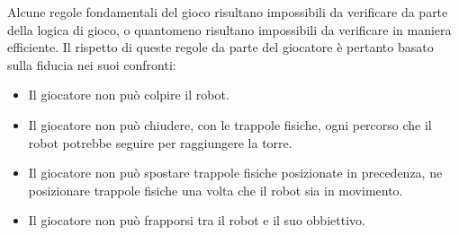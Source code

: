 Alcune regole fondamentali del gioco risultano impossibili da verificare da parte della logica di gioco, o quantomeno risultano impossibili da verificare in maniera efficiente. Il rispetto di queste regole da parte del giocatore è pertanto basato sulla fiducia nei suoi confronti:
	\begin{itemize}
	\item Il giocatore non può colpire il robot.
	\item Il giocatore non può chiudere, con le trappole fisiche, ogni percorso che il robot potrebbe seguire per raggiungere la torre.
	\item Il giocatore non può spostare trappole fisiche posizionate in precedenza, ne posizionare trappole fisiche una volta che il robot sia in movimento.
	\item Il giocatore non può frapporsi tra il robot e il suo obbiettivo.
	\end{itemize}